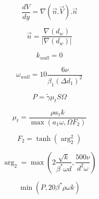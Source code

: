 {\newpage\clearpage
{}%
\begin{displaymath}
    \frac{dV}{dy} = \nabla (\vec{n}.\vec{V}).\vec{n}
\end{displaymath}%
\lthtmldisplayZ
\lthtmlcheckvsize\clearpage}

{\newpage\clearpage
{}%
\begin{displaymath}
    \vec{n} = \frac{\nabla (d_w)}{|\nabla (d_w)|}
\end{displaymath}%
\lthtmldisplayZ
\lthtmlcheckvsize\clearpage}

{\newpage\clearpage
{}%
\begin{displaymath}
    k_{wall} = 0
\end{displaymath}%
\lthtmldisplayZ
\lthtmlcheckvsize\clearpage}

{\newpage\clearpage
{}%
\begin{displaymath}
   \omega_{wall} = 10 \frac{6 \nu}{\beta_1 (\Delta d_1)^2}
\end{displaymath}%
\lthtmldisplayZ
\lthtmlcheckvsize\clearpage}

{\newpage\clearpage
{}%
\begin{displaymath} 
  P = \widetilde{\gamma} \mu_t S\Omega  
\end{displaymath}%
\lthtmldisplayZ
\lthtmlcheckvsize\clearpage}

{\newpage\clearpage
{}%
\begin{displaymath}
\mu_{t}=\frac{\rho a_{1} k}{\max \left(a_{1} \omega, \Omega F_{2}\right)}
\end{displaymath}%
\lthtmldisplayZ
\lthtmlcheckvsize\clearpage}

{\newpage\clearpage
{}%
\begin{displaymath}
F_{2}=\tanh \left(\arg _{2}^{2}\right)
\end{displaymath}%
\lthtmldisplayZ
\lthtmlcheckvsize\clearpage}

{\newpage\clearpage
{}%
\begin{displaymath}
\arg _{2}=\max \left(2 \frac{\sqrt{k}}{\beta^{*} \omega d}, \frac{500 \nu}{d^{2} \omega}\right)
\end{displaymath}%
\lthtmldisplayZ
\lthtmlcheckvsize\clearpage}

{\newpage\clearpage
{}%
\begin{displaymath}
\min \left(P, 20 \beta^{*} \rho \omega k\right)
\end{displaymath}%
\lthtmldisplayZ
\lthtmlcheckvsize\clearpage}

